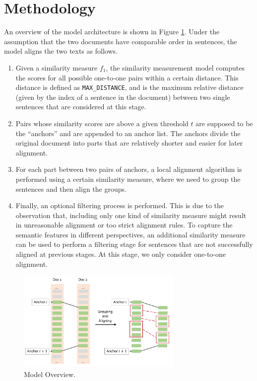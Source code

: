 \section{Methodology}
\label{sec:method}

An overview of the model architecture is shown in Figure \ref{fig:4}. Under the assumption that the two documents have comparable order in sentences, the model aligns the two texts as follows.
\begin{enumerate}
	\item Given a similarity measure $f_1$, the similarity measurement model computes the scores for all possible one-to-one pairs within a certain distance. This distance is defined as \texttt{MAX\_DISTANCE}, and is the maximum relative distance (given by the index of a sentence in the document) between two single sentences that are considered at this stage.
	\item Pairs whose similarity scores are above a given threshold $t$ are supposed to be the ``anchors'' and are appended to an anchor list. The anchors divide the original document into parts that are relatively shorter and easier for later alignment.
	\item For each part between two pairs of anchors, a local alignment algorithm is performed using a certain similarity measure, where we need to group the sentences and then align the groups. 
	\item Finally, an optional filtering process is performed. This is due to the observation that, including only one kind of similarity measure might result in unreasonable alignment or too strict alignment rules. To capture the semantic features in different perspectives, an additional similarity measure can be used to perform a filtering stage for sentences that are not successfully aligned at previous stages. At this stage, we only consider one-to-one alignment.
\end{enumerate}

\begin{figure}[htbp]
	\centering
	\includegraphics[width=8cm]{./4.png}
	\caption{Model Overview.}\label{fig:4}
\end{figure}

